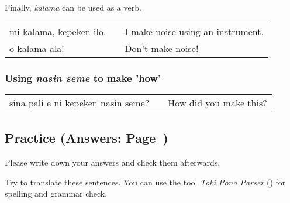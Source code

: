 Finally, \textit{kalama} can be used as a verb. \\
\begin{supertabular}{p{5,5cm}|ll}
mi kalama, kepeken ilo. && I make noise using an instrument. \\
o kalama ala! && Don't make noise! \\
\end{supertabular}  
%
\subsubsection*{Using \textit{nasin seme} to make 'how'}
%
\begin{supertabular}{p{5,5cm}|ll}
sina pali e ni kepeken nasin seme? && How did you make this? \\
\end{supertabular}  
%
%
\newpage
\subsection*{Practice (Answers: Page~\pageref{'pi'})}
%
Please write down your answers and check them afterwards. 

Try to translate these sentences. 
You can use the tool \textit{Toki Pona Parser} (\cite{www:rowa:02}) for spelling and grammar check. 

